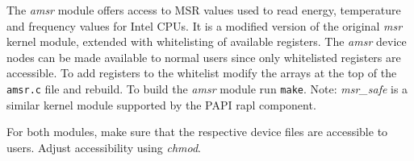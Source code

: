 The \emph{amsr} module offers access to MSR values used to read energy, temperature and frequency values for Intel CPUs.
It is a modified version of the original \emph{msr} kernel module, extended with whitelisting of available registers.
The \emph{amsr} device nodes can be made available to normal users since only whitelisted registers are accessible.
To add registers to the whitelist modify the arrays at the top of the \verb+amsr.c+ file and rebuild.
To build the \emph{amsr} module run \verb+make+.
Note: \emph{msr\_safe} is a similar kernel module supported by the PAPI rapl component.

For both modules, make sure that the respective device files are accessible to users.
Adjust accessibility using \emph{chmod}.



